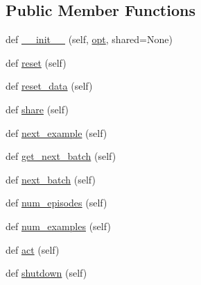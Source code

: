\subsection*{Public Member Functions}
\begin{DoxyCompactItemize}
\item 
def \hyperlink{classparlai_1_1core_1_1pytorch__data__teacher_1_1PytorchDataTeacher_ad5a873d5dcffa72db1d642bdf0db1dc6}{\+\_\+\+\_\+init\+\_\+\+\_\+} (self, \hyperlink{classparlai_1_1core_1_1pytorch__data__teacher_1_1PytorchDataTeacher_abe4c778c23a027a215941e6def84bae0}{opt}, shared=None)
\item 
def \hyperlink{classparlai_1_1core_1_1pytorch__data__teacher_1_1PytorchDataTeacher_a568fb8e02997d9662be51a205d0ea886}{reset} (self)
\item 
def \hyperlink{classparlai_1_1core_1_1pytorch__data__teacher_1_1PytorchDataTeacher_aaf9f8b1b0b358832d16f917c598151fa}{reset\+\_\+data} (self)
\item 
def \hyperlink{classparlai_1_1core_1_1pytorch__data__teacher_1_1PytorchDataTeacher_a519a6be3f88b650d0325402b0c4b80ce}{share} (self)
\item 
def \hyperlink{classparlai_1_1core_1_1pytorch__data__teacher_1_1PytorchDataTeacher_a62003fefcf480fb16038acb7e40b4f15}{next\+\_\+example} (self)
\item 
def \hyperlink{classparlai_1_1core_1_1pytorch__data__teacher_1_1PytorchDataTeacher_a6bf71f580e9be5b517897260f76178c4}{get\+\_\+next\+\_\+batch} (self)
\item 
def \hyperlink{classparlai_1_1core_1_1pytorch__data__teacher_1_1PytorchDataTeacher_aa4e63cd7dd1a904a8424a096f7ca1f63}{next\+\_\+batch} (self)
\item 
def \hyperlink{classparlai_1_1core_1_1pytorch__data__teacher_1_1PytorchDataTeacher_a68a9aac96f1eebc4f40e32f0ebfb5403}{num\+\_\+episodes} (self)
\item 
def \hyperlink{classparlai_1_1core_1_1pytorch__data__teacher_1_1PytorchDataTeacher_a503206272b61d567903ea9bbb70a18c7}{num\+\_\+examples} (self)
\item 
def \hyperlink{classparlai_1_1core_1_1pytorch__data__teacher_1_1PytorchDataTeacher_abf7e494a90ed5c7d037c2b1cfb41c84c}{act} (self)
\item 
def \hyperlink{classparlai_1_1core_1_1pytorch__data__teacher_1_1PytorchDataTeacher_a20ae09e79b2747f8f4c769dda0453937}{shutdown} (self)
\end{DoxyCompactItemize}

